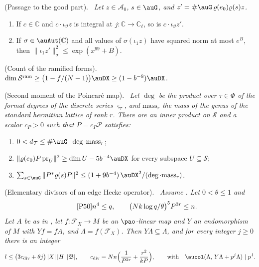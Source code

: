 \documentclass[10pt]{amsart}
\theoremstyle{definition}
\theoremstyle{remark}
\newcommand{\C}{\mathbb C}
\providecommand{\auAz}{\mathcal A_0}
\providecommand{\auP}{\mathcal P}
\providecommand{\auPl}{\Phi}
\providecommand{\auS}{\mathcal S}
\providecommand{\auSram}{\mathcal S^{\mathrm{ram}}}
\providecommand{\auT}{\mathcal T}
\providecommand{\audT}{d_{\auT}}
\providecommand{\phB}{\mathfrak B}
\providecommand{\phcd}{c_{\mathrm{div}}}
\newenvironment{quotedthm}[2]{\par\medskip\noindent\begingroup
  \textbf{#1}#2.\ \itshape\ignorespaces}{\endgroup\par\medskip}
\begin{document}
\begin{quotedthm}{\cite[Proposition~14.28]{P46}}{ (Passage to the good part)}
Let $z\in\auAz$, $s\in\auG$, and $z'=\#\auG\,\varrho(e_0)\varrho(s)z$.
\begin{enumerate}
\item[(a)] If $c\in\C$ and $c\cdot\iota_\vartheta z$ is integral at $j\colon\C\to\C_\ell$, so is
$c\cdot\iota_\vartheta z'$.
\item[(b)] If $\sigma\in\auAut(\C)$ and all values of $\sigma(\iota_1z)$ have squared norm at most
$e^B$, then $\|\iota_1z'\|_\sigma^2\le\exp(x^{99}+B)$.
\end{enumerate}
\end{quotedthm}

\begin{quotedthm}{\cite[Lemma~14.29]{P46}}{ (Count of the ramified forms)}
$\dim\auSram\ge\bigl(1-f/(N-1)\bigr)\auDX\ge(1-b^{-8})\auDX$.
\end{quotedthm}

\begin{quotedthm}{\cite[Proposition~14.32]{P46}}{ (Second moment of the Poincar\'e map)}
Let $\deg$ be the product over $\tau\in\auPl$ of the formal degrees of the discrete series
$\varsigma_\tau$, and $\mathrm{mass}_r$ the mass of the genus of the standard hermitian lattice of
rank $r$. There are an inner product on $\auS$ and a scalar $c_P>0$ such that $P=c_P\auP$
satisfies:
\begin{enumerate}
\item[(i)] $0<\audT\le\#\auG\cdot\deg\cdot\mathrm{mass}_r$;
\item[(ii)] $\|\varrho(e_0)P\,\mathrm{pr}_U\|^2\ge\dim U-5b^{-4}\auDX$ for every subspace
$U\subseteq\auS$;
\item[(iii)] $\sum_{s\in\auG}\|P^*\varrho(s)P\|^2\le(1+9b^{-4})\,\auDX^2/(\deg\cdot
\mathrm{mass}_r)$.
\end{enumerate}
\end{quotedthm}

\begin{quotedthm}{\cite[Theorem~2.2]{P50}}{ (Elementary divisors of an edge Hecke operator)}
Assume {\cite[Propositions~2.10, 2.12 and~2.13]{P50}}. Let $0<\theta\le1$ and
\begin{equation*}\tag*{{\cite[(5)]{P50}}}
n^4\le q,\qquad\bigl(Nk\log q/\theta\bigr)^5P^{3r}\le n .
\end{equation*}
Let $A$ be as in {\cite[(4)]{P50}}, let $f\colon\mathcal F_X\to M$ be an $\pao$-linear map and $Y$
an endomorphism of $M$ with $Yf=fA$, and $\Lambda=f(\mathcal F_X)$. Then $Y\Lambda\subseteq
\Lambda$, and for every integer $j\ge0$ there is an integer
\[
l\le\bigl(3\phcd+\theta j\bigr)\,|X|\,|H|\,|\phB|,\qquad\phcd=Nn\Bigl(\frac1{P^{2r}}+\frac{r^2}{kP}
\Bigr),\qquad\text{with}\quad\aucol(\Lambda,\,Y\Lambda+p^j\Lambda)\mid p^{\,l}.
\]
\end{quotedthm}
\end{document}

